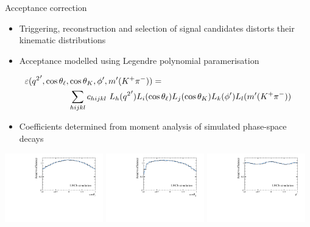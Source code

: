 \documentclass[aspectratio=1610]{beamer}
\begin{document}
\begin{frame}{Acceptance correction}

\begin{itemize}
  \item Triggering, reconstruction and selection of signal candidates distorts their kinematic distributions
  \item Acceptance modelled using Legendre polynomial paramerisation
\end{itemize}
\vspace{0.1cm}
\begin{equation*}
\begin{split}
\varepsilon({q^2}',\cos{\theta_\ell},&\cos{\theta_K},\phi',m'({{K}^+}{{\pi}^-})) = \\
& \sum_{hijkl} c_{hijkl}~L_{h}({q^2}')L_{i}(\cos{\theta_\ell})L_{j}(\cos{\theta_K})L_{k}(\phi')L_{l}(m'({{K}^+}{{\pi}^-}))
 \end{split}
\end{equation*}
\begin{itemize}
  \item Coefficients determined from moment analysis of simulated phase-space \BdToKpimm decays
\end{itemize}

\begin{center}
\includegraphics[width=0.32\textwidth]{figs/kpimm/acceptance/Fig3a.pdf}
\includegraphics[width=0.32\textwidth]{figs/kpimm/acceptance/Fig3b.pdf}
\includegraphics[width=0.32\textwidth]{figs/kpimm/acceptance/Fig3c.pdf}
\end{center}

\end{frame}
\end{document}
